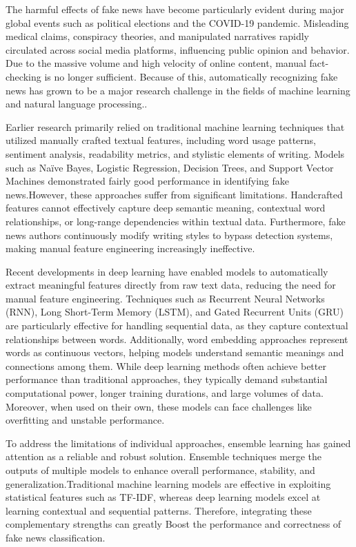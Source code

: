 \documentclass[conference]{IEEEtran}
\begin{document}
The harmful effects of fake news have become particularly evident during major global events such as political elections and the COVID-19 pandemic. Misleading medical claims, conspiracy theories, and manipulated narratives rapidly circulated across social media platforms, influencing public opinion and behavior. Due to the massive volume and high velocity of online content, manual fact-checking is no longer sufficient. Because of this, automatically recognizing fake news has grown to be a major research challenge in the fields of machine learning and natural language processing..

Earlier research primarily relied on traditional machine learning techniques that utilized manually crafted textual features, including word usage patterns, sentiment analysis, readability metrics, and stylistic elements of writing. Models such as Naïve Bayes, Logistic Regression, Decision Trees, and Support Vector Machines demonstrated fairly good performance in identifying fake news.However, these approaches suffer from significant limitations. Handcrafted features cannot effectively capture deep semantic meaning, contextual word relationships, or long-range dependencies within textual data. Furthermore, fake news authors continuously modify writing styles to bypass detection systems, making manual feature engineering increasingly ineffective.

Recent developments in deep learning have enabled models to automatically extract meaningful features directly from raw text data, reducing the need for manual feature engineering. Techniques such as Recurrent Neural Networks (RNN), Long Short-Term Memory (LSTM), and Gated Recurrent Units (GRU) are particularly effective for handling sequential data, as they capture contextual relationships between words. Additionally, word embedding approaches represent words as continuous vectors, helping models understand semantic meanings and connections among them. While deep learning methods often achieve better performance than traditional approaches, they typically demand substantial computational power, longer training durations, and large volumes of data. Moreover, when used on their own, these models can face challenges like overfitting and unstable performance.

To address the limitations of individual approaches, ensemble learning has gained attention as a reliable and robust solution. Ensemble techniques merge the outputs of multiple models to enhance overall performance, stability, and generalization.Traditional machine learning models are effective in exploiting statistical features such as TF-IDF, whereas deep learning models excel at learning contextual and sequential patterns. Therefore, integrating these complementary strengths can greatly Boost the performance and correctness of fake news classification.
\end{document}
